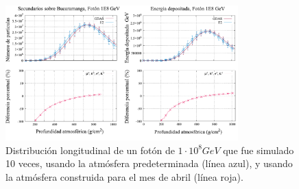 \begin{figure}[htb!]
\centering
\includegraphics[width=0.8\textwidth]{images/foton_1E8.pdf}
\caption[Distribución longitudinal de un fotón de $1\cdot 10^{8}$ GeV.]{Distribución longitudinal de un fotón de $1\cdot 10^{8} GeV$ que fue simulado 10 veces, usando la atmósfera predeterminada (línea azul), y usando la atmósfera construida para el mes de abril (línea roja). }
\label{fig:fig32}
\end{figure}





